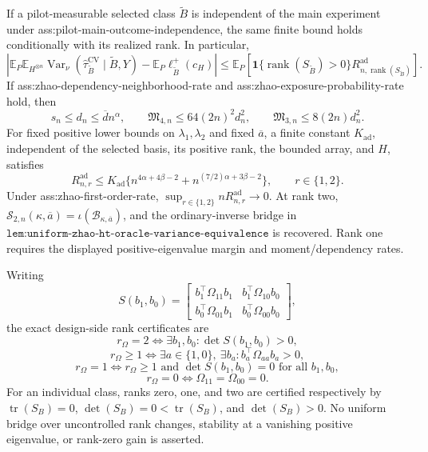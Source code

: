 If a pilot-measurable selected class \(\widetilde B\) is independent of the main experiment under ass:pilot-main-outcome-independence, the same finite bound holds conditionally with its realized rank.  In particular,
\[
\left|\mathbb E_P\mathbb E_{H^{\otimes n}}
\operatorname{Var}_\nu(\widehat\tau_{\widetilde B}^{\mathrm{CV}}
\mid\widetilde B,Y)
-\mathbb E_P\ell_{\widetilde B}^+(c_H)\right|
\le\mathbb E_P\!\left[
\mathbf1\{\operatorname{rank}(S_{\widetilde B})>0\}
R_{n,\operatorname{rank}(S_{\widetilde B})}^{\mathrm{ad}}
\right].
\]
If ass:zhao-dependency-neighborhood-rate and ass:zhao-exposure-probability-rate hold, then
\[
s_n\le d_n\le\overline d n^\alpha,
\qquad
\mathfrak M_{4,n}\le64(2n)^2d_n^2,
\qquad
\mathfrak M_{3,n}\le8(2n)d_n^2.
\]
For fixed positive lower bounds on \(\lambda_1,\lambda_2\) and fixed \(\overline a\), a finite constant \(K_{\mathrm{ad}}\), independent of the selected basis, its positive rank, the bounded array, and \(H\), satisfies
\[
R_{n,r}^{\mathrm{ad}}
\le K_{\mathrm{ad}}
\{n^{4\alpha+4\beta-2}
+n^{(7/2)\alpha+3\beta-2}\},
\qquad r\in\{1,2\}.
\]
Under ass:zhao-first-order-rate, \(\sup_{r\in\{1,2\}}nR_{n,r}^{\mathrm{ad}}\to0\).  At rank two, \(\mathcal S_{2,n}(\kappa,\overline a)=\iota(\mathcal B_{\kappa,\overline a})\), and the ordinary-inverse bridge in \(\texttt{lem:uniform-zhao-ht-oracle-variance-equivalence}\) is recovered.  Rank one requires the displayed positive-eigenvalue margin and moment/dependency rates.

Writing
\[
S(b_1,b_0)=
\begin{bmatrix}
b_1^{\top}\Omega_{11}b_1&b_1^{\top}\Omega_{10}b_0\\
b_0^{\top}\Omega_{01}b_1&b_0^{\top}\Omega_{00}b_0
\end{bmatrix},
\]
the exact design-side rank certificates are
\[
r_\Omega=2\Longleftrightarrow
\exists b_1,b_0:\det S(b_1,b_0)>0,
\]
\[
r_\Omega\ge1\Longleftrightarrow
\exists a\in\{1,0\},\ \exists b_a:
b_a^{\top}\Omega_{aa}b_a>0,
\]
\[
r_\Omega=1\Longleftrightarrow r_\Omega\ge1
\text{ and }\det S(b_1,b_0)=0\text{ for all }b_1,b_0,
\]
\[
r_\Omega=0\Longleftrightarrow\Omega_{11}=\Omega_{00}=0.
\]
For an individual class, ranks zero, one, and two are certified respectively by \(\operatorname{tr}(S_B)=0\), \(\det(S_B)=0<\operatorname{tr}(S_B)\), and \(\det(S_B)>0\).  No uniform bridge over uncontrolled rank changes, stability at a vanishing positive eigenvalue, or rank-zero gain is asserted.